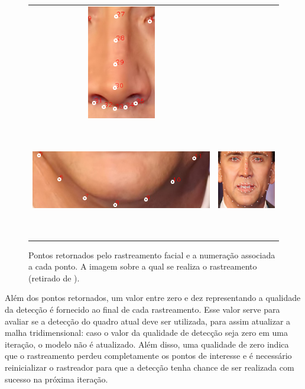\begin{figure}
\begin{tabular}{cc}
\includegraphics[width=0.4\linewidth, height=5cm]{figs/nick-marked-nose.png} \\
\includegraphics[width=0.4\linewidth, height=5cm]{figs/nick-marked-queixo.png} &
\includegraphics[width=0.4\linewidth, height=5cm]{figs/nick-marked.png}
\end{tabular}
\caption{Pontos retornados pelo rastreamento facial e a numeração associada a cada ponto. A imagem sobre a qual se realiza o rastreamento (retirado de \cite{nicolas}).}
\label{fig:tracked-facial-points}
\end{figure}


Além dos pontos retornados, um valor entre zero e dez representando a qualidade
da detecção é fornecido ao final de cada rastreamento. Esse valor serve para
avaliar se a detecção do quadro atual deve ser utilizada, para assim atualizar a
malha tridimensional: caso o valor da qualidade de detecção seja zero em uma
iteração, o modelo não é atualizado. Além disso, uma qualidade de zero indica
que o rastreamento perdeu completamente os pontos de interesse e é necessário
reinicializar o rastreador para que a detecção tenha chance de ser realizada com
sucesso na próxima iteração.

